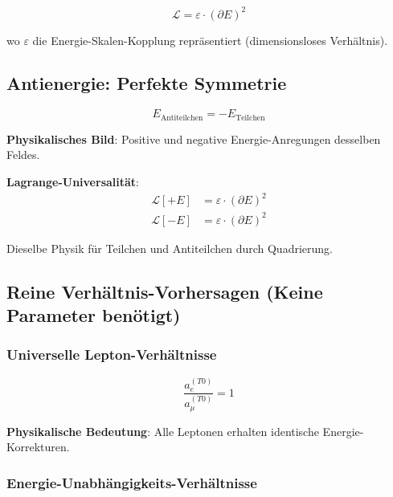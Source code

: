 \documentclass[12pt,a4paper]{article}
\newcommand{\Lag}{\mathcal{L}}
\newcommand{\Efield}{E}
\theoremstyle{definition}
\theoremstyle{remark}
\begin{document}
	\begin{equation}
		\boxed{\Lag = \varepsilon \cdot (\partial \Efield)^2}
		\label{eq:universal_lagrangian}
	\end{equation}
	
	wo $\varepsilon$ die Energie-Skalen-Kopplung repräsentiert (dimensionsloses Verhältnis).
	
	\subsection{Antienergie: Perfekte Symmetrie}
	
	\begin{equation}
		\boxed{\Efield_{\text{Antiteilchen}} = -\Efield_{\text{Teilchen}}}
		\label{eq:energy_antisymmetry}
	\end{equation}
	
	\textbf{Physikalisches Bild}: Positive und negative Energie-Anregungen desselben Feldes.
	
	\textbf{Lagrange-Universalität}:
	\begin{align}
		\Lag[+\Efield] &= \varepsilon \cdot (\partial \Efield)^2 \\
		\Lag[-\Efield] &= \varepsilon \cdot (\partial \Efield)^2
	\end{align}
	
	Dieselbe Physik für Teilchen und Antiteilchen durch Quadrierung.
	
	\subsection{Reine Verhältnis-Vorhersagen (Keine Parameter benötigt)}
	
	\subsubsection{Universelle Lepton-Verhältnisse}
	
	\begin{equation}
		\boxed{\frac{a_e^{(T0)}}{a_{\mu}^{(T0)}} = 1}
		\label{eq:universal_lepton_ratio}
	\end{equation}
	
	\textbf{Physikalische Bedeutung}: Alle Leptonen erhalten identische Energie-Korrekturen.
	
	\subsubsection{Energie-Unabhängigkeits-Verhältnisse}
	
\end{document}
